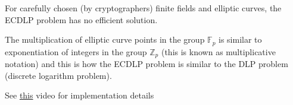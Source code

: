 \documentclass{article}
\begin{document}
For carefully chosen (by cryptographers) finite fields and elliptic curves, the ECDLP problem has no efficient solution.

The multiplication of elliptic curve points in the group $\mathbb{F}_{p}$ is similar to exponentiation of integers in the group $\mathbb{Z}_{p}$ (this is known as multiplicative notation) and this is how the ECDLP problem is similar to the DLP problem (discrete logarithm problem).

See \href{https://www.youtube.com/watch?v=gAtBM06xwaw}{this} video for implementation details


    


\end{document}
